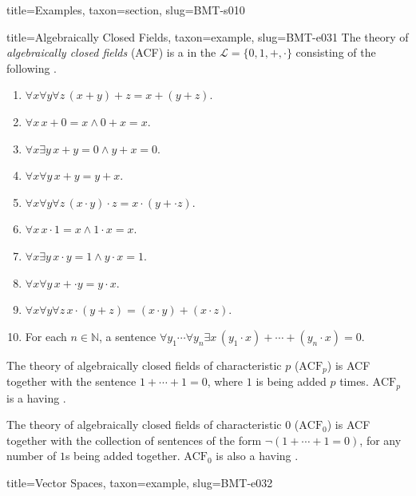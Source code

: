 \documentclass[a4paper]{article}
\begin{document}
\begin{tree}{title={Examples}, taxon={section}, slug={BMT-s010}}
\begin{tree}{title={Algebraically Closed Fields}, taxon={example}, slug={BMT-e031}}
    The theory of \emph{algebraically closed fields} (ACF) is a  in the  \(\mathcal  L= \{ 0,1,+, \cdot \}\)
    consisting of the following .
    \begin{enumerate}
\item{\(\forall  x \forall  y \forall  z \, (x+y)+z=x+(y+z)\).
        }
        \item{\(\forall  x \, x+0=x \land0 +x=x\).
        }
        \item{\(\forall  x \exists  y \, x+y=0 \land  y+x=0\).
        }
        \item{\(\forall  x \forall  y \, x+y=y+x\).
        }
        \item{\(\forall  x \forall  y \forall  z \, (x \cdot  y) \cdot  z=x \cdot  (y+ \cdot  z)\).
        }
        \item{\(\forall  x \, x \cdot1 =x \land1 \cdot  x=x\).
        }
        \item{\(\forall  x \exists  y \, x \cdot  y=1 \land  y \cdot  x=1\).
        }
        \item{\(\forall  x \forall  y \, x+ \cdot  y=y \cdot  x\).
        }
        \item{\(\forall  x \forall  y \forall  z \, x \cdot (y+z)=(x \cdot  y)+(x \cdot  z)\).
        }
        \item{
            For each \(n \in \mathbb  N\), a sentence \(\forall  y_1 \cdots \forall  y_n \exists  x \, (y_1 \cdot  x)+ \cdots +(y_n \cdot  x)=0\).
        }
\end{enumerate}\par{
    The theory of algebraically closed fields of characteristic \(p\) (\(\text {ACF}_p\)) is ACF together with the sentence
    \(1+ \cdots +1=0\), where \(1\) is being added \(p\) times. \(\text {ACF}_p\) is a  having
    .
}\par{
    The theory of algebraically closed fields of characteristic \(0\) (\(\text {ACF}_0\)) is ACF together with the collection of sentences
    of the form \(\neg (1+ \cdots +1=0)\), for any number of \(1\)s being added together. \(\text {ACF}_0\) is also a
     having .
}
\end{tree}

\begin{tree}{title={Vector Spaces}, taxon={example}, slug={BMT-e032}}


\end{tree}
\end{tree}
\end{document}

